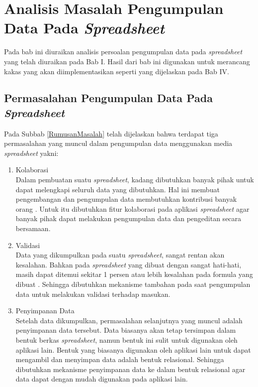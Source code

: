 \chapter{Analisis Masalah Pengumpulan Data Pada \textit{Spreadsheet}}

Pada bab ini diuraikan analisis persoalan pengumpulan data pada \textit{spreadsheet} yang telah diuraikan pada Bab I. Hasil dari bab ini digunakan untuk merancang kakas yang akan diimplementasikan seperti yang dijelaskan pada Bab IV.

\section{Permasalahan Pengumpulan Data Pada \textit{Spreadsheet}} \label{AspekAplikasi}
Pada Subbab \ref{RumusanMasalah} telah dijelaskan bahwa terdapat tiga permasalahan yang muncul dalam pengumpulan data menggunakan media \textit{spreadsheet} yakni:
\begin{enumerate}
	\item Kolaborasi \\
	Dalam pembuatan suatu \textit{spreadsheet}, kadang dibutuhkan banyak pihak untuk dapat melengkapi seluruh data yang dibutuhkan. Hal ini membuat pengembangan dan pengumpulan data membutuhkan kontribusi banyak orang \citep{Panko1998}. Untuk itu dibutuhkan fitur kolaborasi pada aplikasi \textit{spreadsheet} agar banyak pihak dapat melakukan pengumpulan data dan pengeditan secara bersamaan.
	\item Validasi \\
	Data yang dikumpulkan pada suatu \textit{spreadsheet}, sangat rentan akan kesalahan. Bahkan pada \textit{spreadsheet} yang dibuat dengan sangat hati-hati, masih dapat ditemui sekitar 1 persen atau lebih kesalahan pada formula yang dibuat \citep{Panko1998}. Sehingga dibutuhkan mekanisme tambahan pada saat pengumpulan data untuk melakukan validasi terhadap masukan.
	\item Penyimpanan Data \\
	Setelah data dikumpulkan, permasalahan selanjutnya yang muncul adalah penyimpanan data tersebut. Data biasanya akan tetap tersimpan dalam bentuk berkas \textit{spreadsheet}, namun bentuk ini sulit untuk digunakan oleh aplikasi lain. Bentuk yang biasanya digunakan oleh aplikasi lain untuk dapat mengambil dan menyimpan data adalah bentuk relasional. Sehingga dibutuhkan mekanisme penyimpanan data ke dalam bentuk relasional agar data dapat dengan mudah digunakan pada aplikasi lain.
\end{enumerate}

